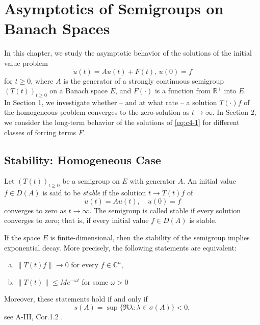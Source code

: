 \chapter{Asymptotics of Semigroups on Banach Spaces}\label{chap:c4}
In this chapter, we study the asymptotic behavior of the solutions of the initial value problem
\begin{equation}\label{eq:c4-1}
\dot{u}(t) = Au(t) + F(t), \, u(0) = f \tag{*}
\end{equation}
for \( t \geq 0 \), where \( A \) is the generator of a strongly continuous semigroup \( (T(t))_{t \geq 0} \) on a Banach space \( E \), and \( F(\cdot) \) is a function from \( \mathbb{R}^{+} \) into \( E \).\\
\noindent
In Section 1, we investigate whether -- and at what rate -- a solution \( T(\cdot)f \) of the homogeneous problem converges to the zero solution as \( t \to \infty \). 
In Section 2, we consider the long-term behavior of the solutions of \eqref{eq:c4-1} for different classes of forcing terms \( F \).
\section{Stability: Homogeneous Case}\label{sec:c4-1}
Let \( (T(t))_{t \geq 0} \) be a semigroup on \( E \) with generator \( A \).
An initial value \( f \in D(A) \) is said to be \emph{stable} if the solution \( t \to T(t)f \) of
\begin{equation}\label{eq:c4-2}
\dot{u}(t) = Au(t), \quad u(0) = f \tag{ACP}
\end{equation}
converges to zero as \( t \to \infty \). 
The semigroup is called stable if every solution converges to zero; that is, if every initial value \( f \in D(A) \) is stable.

If the space \( E \) is finite-dimensional, then the stability of the semigroup implies exponential decay. 
More precisely, the following statements are equivalent:
\begin{enumerate}[(a)]
\item \( \|T(t)f\| \to 0 \) for every \( f \in \mathbb{C}^{n} \),
\item \( \|T(t)\| \leq Me^{-\omega t} \) for some \( \omega > 0 \)
\end{enumerate}
Moreover, these statements hold if and only if
\[
s(A) = \sup\{\Re \lambda : \lambda \in \sigma(A)\} < 0,
\]
see A-III, Cor.1.2 .
\goodbreak

